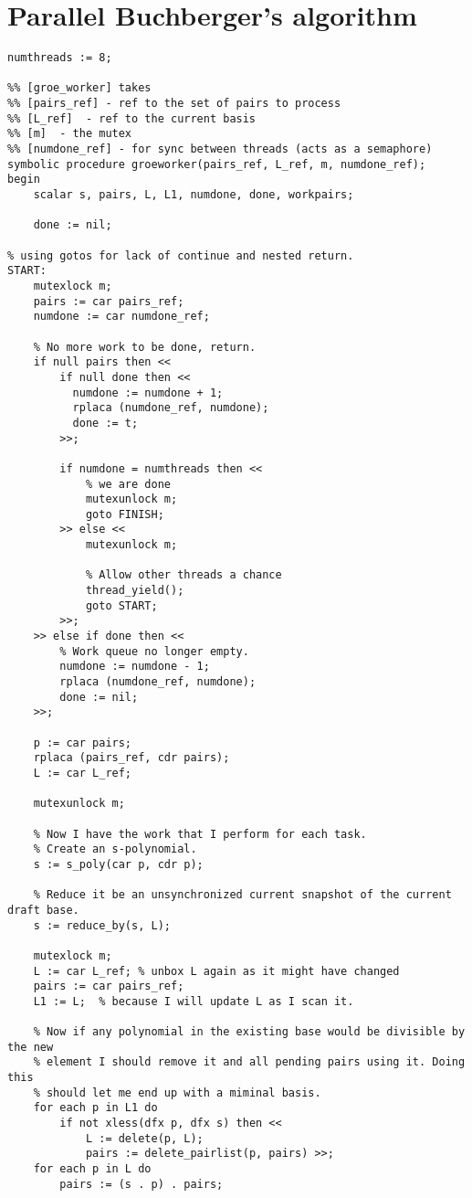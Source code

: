 \section{Parallel Buchberger's algorithm}
\label{sec:buchberger}

\begin{code}
\begin{verbatim}
numthreads := 8;

%% [groe_worker] takes
%% [pairs_ref] - ref to the set of pairs to process
%% [L_ref]  - ref to the current basis
%% [m]  - the mutex
%% [numdone_ref] - for sync between threads (acts as a semaphore)
symbolic procedure groeworker(pairs_ref, L_ref, m, numdone_ref);
begin
    scalar s, pairs, L, L1, numdone, done, workpairs;

    done := nil;

% using gotos for lack of continue and nested return.
START:
    mutexlock m;
    pairs := car pairs_ref;
    numdone := car numdone_ref;

    % No more work to be done, return.
    if null pairs then <<
        if null done then <<
          numdone := numdone + 1;
          rplaca (numdone_ref, numdone);
          done := t;
        >>;

        if numdone = numthreads then <<
            % we are done
            mutexunlock m;
            goto FINISH;
        >> else <<
            mutexunlock m;

            % Allow other threads a chance
            thread_yield();
            goto START;
        >>;
    >> else if done then <<
        % Work queue no longer empty.
        numdone := numdone - 1;
        rplaca (numdone_ref, numdone);
        done := nil;
    >>;

    p := car pairs;
    rplaca (pairs_ref, cdr pairs);
    L := car L_ref;

    mutexunlock m;

    % Now I have the work that I perform for each task.
    % Create an s-polynomial.
    s := s_poly(car p, cdr p);

    % Reduce it be an unsynchronized current snapshot of the current draft base.
    s := reduce_by(s, L);

    mutexlock m;
    L := car L_ref; % unbox L again as it might have changed
    pairs := car pairs_ref;
    L1 := L;  % because I will update L as I scan it.

    % Now if any polynomial in the existing base would be divisible by the new
    % element I should remove it and all pending pairs using it. Doing this
    % should let me end up with a miminal basis.
    for each p in L1 do
        if not xless(dfx p, dfx s) then <<
            L := delete(p, L);
            pairs := delete_pairlist(p, pairs) >>;
    for each p in L do
        pairs := (s . p) . pairs;


\end{verbatim}
\end{code}
